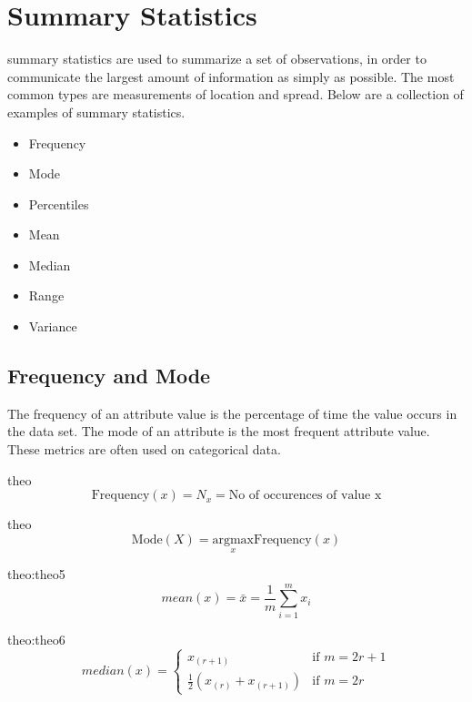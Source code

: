\section{Summary Statistics}
summary statistics are used to summarize a set of observations, in order to 
communicate the largest amount of information as simply as possible. The most 
common types are measurements of location and spread. Below are a collection of
examples of summary statistics.

\begin{itemize}
    \item Frequency
    \item Mode
    \item Percentiles
    \item Mean
    \item Median
    \item Range
    \item Variance
\end{itemize}

\subsection{Frequency and Mode}
The frequency of an attribute value is the percentage of time the value occurs 
in the data set. The mode of an attribute is the most frequent attribute value.
These metrics are often used on categorical data. 

\begin{theo}[Frequency]{theo}
    \label{eq:Frequency}
        \[
            \text{Frequency}(x) = N_x = \text{No of occurences of value x}
        \]
\end{theo}

\begin{theo}[Mode]{theo}
    \label{eq:Mode}
        \[
            \text{Mode}(X) = \underset{x}{\mathrm{arg max} } \text{Frequency}(x)
        \]
\end{theo}

\begin{theo}[Mean]{theo:theo5}
    \label{eq:mean}
        \[
            mean(x) = \bar{x} = \frac{1}{m}\sum_{i=1}^m x_i
        \]
\end{theo}



\begin{theo}[Median]{theo:theo6}
    \label{eq:median}
        \[
            median(x) = 
            \left\{\begin{matrix}
                x_{(r+1)} & \text{if } m=2r+1 \\ 
                \frac{1}{2} \left( x_{(r)} + x_{(r+1)} \right)  & \text{if } m=2r
            \end{matrix}\right.
        \]
\end{theo}

